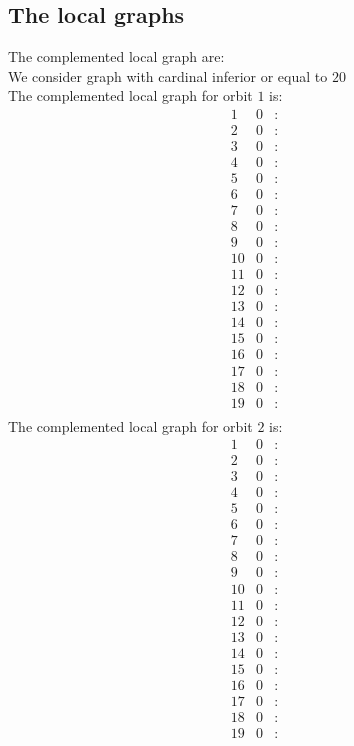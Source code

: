 \documentclass[12pt]{article}
\begin{document}
\subsection{The local graphs}
The complemented local graph are:\\
We consider graph with cardinal inferior or equal to $20$\\
The complemented local graph for orbit $1$ is:
\begin{equation*}
\begin{array}{rrcl}
1&0&:&\\
2&0&:&\\
3&0&:&\\
4&0&:&\\
5&0&:&\\
6&0&:&\\
7&0&:&\\
8&0&:&\\
9&0&:&\\
10&0&:&\\
11&0&:&\\
12&0&:&\\
13&0&:&\\
14&0&:&\\
15&0&:&\\
16&0&:&\\
17&0&:&\\
18&0&:&\\
19&0&:&\\
\end{array}
\end{equation*}
The complemented local graph for orbit $2$ is:
\begin{equation*}
\begin{array}{rrcl}
1&0&:&\\
2&0&:&\\
3&0&:&\\
4&0&:&\\
5&0&:&\\
6&0&:&\\
7&0&:&\\
8&0&:&\\
9&0&:&\\
10&0&:&\\
11&0&:&\\
12&0&:&\\
13&0&:&\\
14&0&:&\\
15&0&:&\\
16&0&:&\\
17&0&:&\\
18&0&:&\\
19&0&:&\\
\end{array}
\end{equation*}
\end{document}
